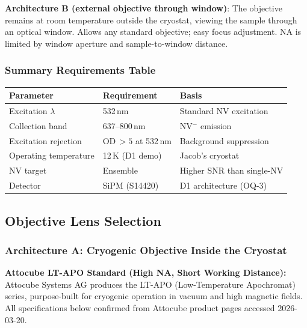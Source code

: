 \textbf{Architecture B (external objective through window)}: The objective
remains at room temperature outside the cryostat, viewing the sample through
an optical window. Allows any standard objective; easy focus adjustment.
NA is limited by window aperture and sample-to-window distance.


\subsubsection{Summary Requirements Table}

\begin{center}
\begin{tabular}{lll}
\toprule
\textbf{Parameter} & \textbf{Requirement} & \textbf{Basis} \\
\midrule
Excitation $\lambda$ & 532\,nm & Standard NV excitation\cite{Rondin2014} \\
Collection band & 637--800\,nm & NV$^-$ emission\cite{Doherty2013} \\
Excitation rejection & OD\,$> 5$ at 532\,nm & Background suppression \\
Operating temperature & 12\,K (D1 demo) & Jacob's cryostat \\
NV target & Ensemble & Higher SNR than single-NV \\
Detector & SiPM (S14420)\cite{S14420datasheet} & D1 architecture (OQ-3) \\
\bottomrule
\end{tabular}
\end{center}

\subsection{Objective Lens Selection}
\label{sec:oq4_objective}

\subsubsection{Architecture A: Cryogenic Objective Inside the Cryostat}

\textbf{Attocube LT-APO Standard (High NA, Short Working Distance):}
Attocube Systems AG produces the LT-APO (Low-Temperature Apochromat) series,
purpose-built for cryogenic operation in vacuum and high magnetic fields.
All specifications below confirmed from Attocube product pages accessed
2026-03-20.\cite{AttocubeLTAPO_web}


